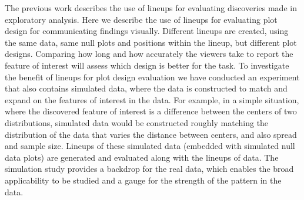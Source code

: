 The previous work \citet{buja:2009,wickham:2010} describes the use of lineups for evaluating discoveries made in exploratory analysis. Here we describe the use of lineups for evaluating plot design for communicating findings visually. Different lineups are created, using the same data, same null plots and positions within the lineup, but different plot designs. Comparing how long and how accurately the viewers take to report the feature of interest will assess which design is better for the task. To investigate the benefit of lineups for plot design evaluation we have conducted an experiment that also contains simulated data, where the data is constructed to match and expand on the features of interest in the data. For example, in a simple situation, where the discovered feature of interest is a difference between the centers of two distributions, simulated data would be constructed roughly matching the distribution of the data that varies the distance between centers, and also spread and sample size. Lineups of these simulated data (embedded with simulated null data plots) are generated and evaluated along with the lineups of data. The simulation study provides a backdrop for the real data, which enables the broad applicability to be studied and a gauge for the strength of the pattern in the data.




